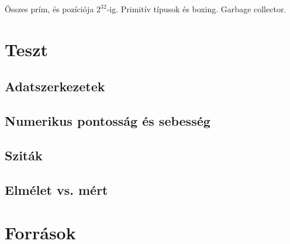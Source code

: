 \documentclass[12pt]{report}
\begin{document}
Összes prím, és pozíciója $2^32$-ig. Primitív típusok és boxing. Garbage collector.

\section{Teszt}

\subsection{Adatszerkezetek}

\subsection{Numerikus pontosság és sebesség}

\subsection{Sziták}

\subsection{Elmélet vs. mért}

\section{Források}
\end{document}

